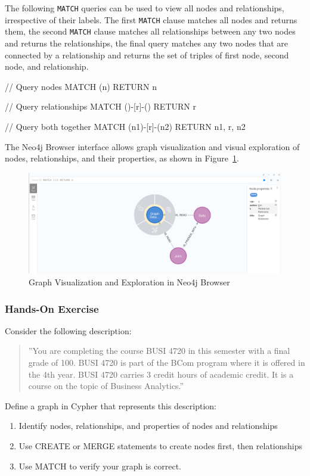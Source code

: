 The following \texttt{MATCH} queries can be used to view all nodes and relationships, irrespective of their labels. The first \texttt{MATCH} clause matches all nodes and returns them, the second \texttt{MATCH} clause matches all relationships between any two nodes and returns the relationships, the final query matches any two nodes that are connected by a relationship and returns the set of triples of first node, second node, and relationship.

\begin{samepage}
\begin{cyphercode}
// Query nodes
MATCH (n) RETURN n    
                
// Query relationships
MATCH ()-[r]-() RETURN r              

// Query both together
MATCH (n1)-[r]-(n2) RETURN n1, r, n2  
\end{cyphercode}
\end{samepage}

\noindent The Neo4j Browser interface allows graph visualization and visual exploration of nodes, relationships, and their properties, as shown in Figure~\ref{fig:neo4jgraphviz}.

\begin{figure}[h]
\centering
\includegraphics[width=.8\textwidth]{screen2.png}
\caption{Graph Visualization and Exploration in Neo4j Browser}
\label{fig:neo4jgraphviz}
\end{figure}

\begin{tcolorbox}[colback=code]
\subsubsection*{Hands-On Exercise}

Consider the following description:

\begin{quote}
''You are completing the course BUSI 4720 in this semester with a final grade of 100. BUSI 4720 is part of the BCom program where it is offered in the 4th year. BUSI 4720 carries 3 credit hours of academic credit. It is a course on the topic of Business Analytics.''
\end{quote}

Define a graph in Cypher that represents this description:
\begin{enumerate}
  \item Identify nodes, relationships, and properties of nodes and relationships
  \item Use CREATE or MERGE statements to create nodes first, then relationships
  \item Use MATCH to verify your graph is correct.
\end{enumerate}
\end{tcolorbox}

